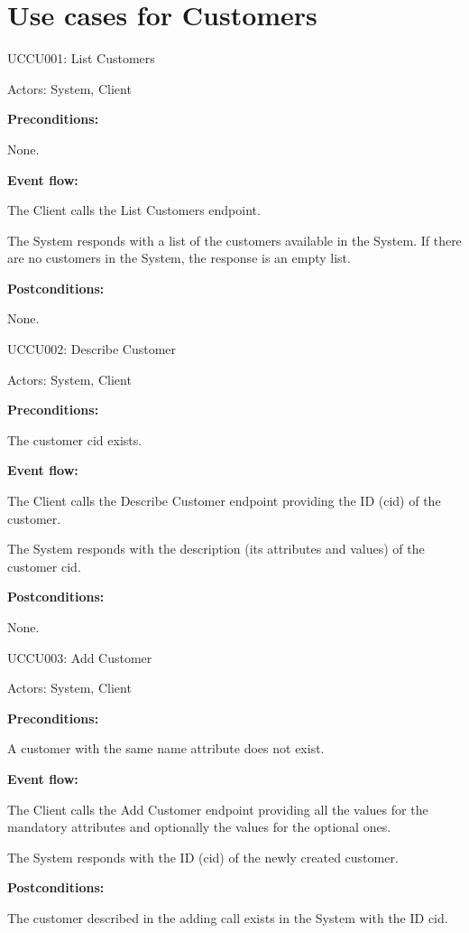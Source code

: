 \section{Use cases for Customers}

\begin{ucbox}{UCCU001: List Customers}
\label{UCCU001}

Actors: System, Client

\textbf{Preconditions:}

\ucitem None.

\textbf{Event flow:}

\ucitem The Client calls the List Customers endpoint.

\ucitem The System responds with a list of the customers available in the System. If there are no customers in the System, the response is an empty list.

\textbf{Postconditions:}

\ucitem None.

\end{ucbox}

\begin{ucbox}{UCCU002: Describe Customer}
\label{UCCU002}

Actors: System, Client

\textbf{Preconditions:}

\ucitem The customer cid exists.

\textbf{Event flow:}

\ucitem The Client calls the Describe Customer endpoint providing the ID (cid) of the customer.

\ucitem The System responds with the description (its attributes and values) of the customer cid.

\textbf{Postconditions:}

\ucitem None.

\end{ucbox}

\begin{ucbox}{UCCU003: Add Customer}
\label{UCCU003}

Actors: System, Client

\textbf{Preconditions:}

\ucitem A customer with the same name attribute does not exist.

\textbf{Event flow:}

\ucitem The Client calls the Add Customer endpoint providing all the values for the mandatory attributes and optionally the values for the optional ones.

\ucitem The System responds with the ID (cid) of the newly created customer.

\textbf{Postconditions:}

\ucitem The customer described in the adding call exists in the System with the ID cid.

\end{ucbox}

